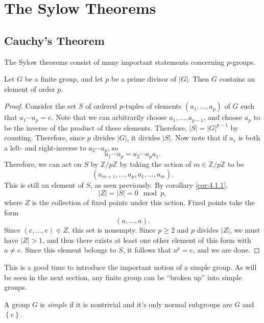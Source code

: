 \section{The Sylow Theorems}
\subsection{Cauchy's Theorem}
The Sylow theorems consist of many important statements concerning $p$-groups.
\begin{theorem}[Cauchy]\label{thm:2.1.1}
	Let $G$ be a finite group, and let $p$ be a prime divisor of $\left| G \right| $. Then $G$ contains an element of order $p$.
\end{theorem}
\begin{proof}
	Consider the set $S$ of ordered $p$-tuples of elements $(a_1, \ldots, a_p )$ of $G$ such that $a_1 \cdots a_p = e$. Note that we can arbitrarily choose $a_1, \ldots, a_{p-1} $, and choose $a_p$ to be the inverse of the product of these elements. Therefore, $\left| S \right| = \left| G \right| ^{p-1} $ by counting. Therefore, since $p$ divides $\left| G \right| $, it divides $\left| S \right| $. Now note that if $a_1$ is both a left- and right-inverse to $a_2 \cdots a_p$, so
	\[
		a_1 \cdots a_p = a_2 \cdots a_p a_1
	.\]
	Therefore, we can act on $S$ by $\mathbb{Z} /p\mathbb{Z} $ by taking the action of $m\in\mathbb{Z} /p\mathbb{Z} $ to be
	\[
		(a_{m+1} , \ldots , a_p, a_1, \ldots , a_m) 
	.\]
	This is still an element of $S$, as seen previously. By corollary \ref{cor:4.1.1},
	\[
		\left| Z \right| =\left| S \right| =0\mod{p}
	,\]
	where $Z$ is the collection of fixed points under this action. Fixed points take the form
	\[
		(a, \ldots ,a)
	.\]
	Since $(e, \ldots ,e)\in Z$, this set is nonempty. Since $p\geq 2$ and $p$ divides $\left| Z \right| $, we must have $\left| Z \right| >1$, and thus there exists at least one other element of this form with $a\neq e$. Since this element belongs to $S$, it follows that $a^p=e$, and we are done.
\end{proof}

This is a good time to introduce the important notion of a simple group. As will be seen in the next section, any finite group can be ``broken up'' into simple groups.
\begin{definition}\label{dfn:4.2.1}
	A group $G$ is \emph{simple} if it is nontrivial and it's only normal subgroups are $G$ and $\left\{ e \right\} $.
\end{definition}

